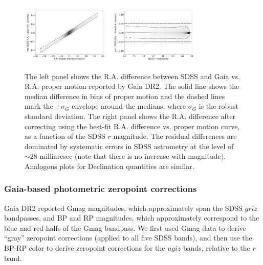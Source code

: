 \begin{figure}[th!]
\centering \includegraphics[width=0.4\textwidth, keepaspectratio]{figures/astroVSpm_RA_pm.png}
\centering \includegraphics[width=0.4\textwidth, keepaspectratio]{figures/astroVSpm_RA_r.png}

\caption{The left panel shows the R.A. difference between SDSS and Gaia 
vs. R.A. proper motion reported by Gaia DR2. The solid line shows the median difference in bins 
of proper motion and the dashed lines mark the $\pm \sigma_G$ envelope around the medians,
where $\sigma_G$ is the robust standard deviation. The right panel shows the R.A. difference 
after correcting using the best-fit R.A. difference vs. 
proper motion curve, as a function of the SDSS $r$ magnitude. The residual differences are dominated 
by systematic errors in SDSS astrometry at the level of $\sim28$ milliarcsec (note that there is no increase with 
magnitude). Analogous plots for Declination quantities are similar. 
\label{fig:GaiaRApm}}
\end{figure}
  

\subsubsection{Gaia-based photometric zeropoint corrections  \label{sec:GaiaCorr2}}

Gaia DR2 reported Gmag magnitudes, which approximately span the SDSS $griz$ bandpasses, 
and BP and RP magnitudes, which approximately correspond to the blue and red halfs of the 
Gmag bandpass. We first used Gmag data to derive ``gray'' zeropoint corrections (applied to
all five SDSS bands), and then use the BP-RP color to derive zeropoint corrections for the 
$ugiz$ bands, relative to the $r$ band. 


